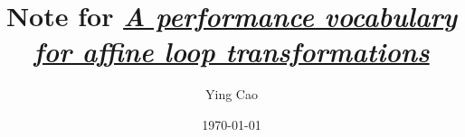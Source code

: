 \documentclass {article}
\title{Note for
\textit{\href{https://arxiv.org/pdf/1811.06043.pdf}{A performance vocabulary for affine loop transformations}}}
\author{Ying Cao}
\date{\today}
\begin{document}
\maketitle
\tableofcontents
\newpage


{
\small
\raggedright

\begin{spacing}{1}

\end{spacing}
}
\end{document}

